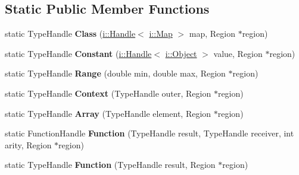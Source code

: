 \subsection*{Static Public Member Functions}
\begin{DoxyCompactItemize}
\item 
\hypertarget{classv8_1_1internal_1_1_type_impl_ab3e641409ec9bed3b628f107d8d888aa}{}static Type\+Handle {\bfseries Class} (\hyperlink{classv8_1_1internal_1_1_handle}{i\+::\+Handle}$<$ \hyperlink{classv8_1_1internal_1_1_map}{i\+::\+Map} $>$ map, Region $\ast$region)\label{classv8_1_1internal_1_1_type_impl_ab3e641409ec9bed3b628f107d8d888aa}

\item 
\hypertarget{classv8_1_1internal_1_1_type_impl_a8a767c3020727c1d503c132b374b3911}{}static Type\+Handle {\bfseries Constant} (\hyperlink{classv8_1_1internal_1_1_handle}{i\+::\+Handle}$<$ \hyperlink{classv8_1_1internal_1_1_object}{i\+::\+Object} $>$ value, Region $\ast$region)\label{classv8_1_1internal_1_1_type_impl_a8a767c3020727c1d503c132b374b3911}

\item 
\hypertarget{classv8_1_1internal_1_1_type_impl_ac423a3cd24ed930b3a1a114ba6c821c4}{}static Type\+Handle {\bfseries Range} (double min, double max, Region $\ast$region)\label{classv8_1_1internal_1_1_type_impl_ac423a3cd24ed930b3a1a114ba6c821c4}

\item 
\hypertarget{classv8_1_1internal_1_1_type_impl_af82147ba750aced8b1127cbb6dc107a6}{}static Type\+Handle {\bfseries Context} (Type\+Handle outer, Region $\ast$region)\label{classv8_1_1internal_1_1_type_impl_af82147ba750aced8b1127cbb6dc107a6}

\item 
\hypertarget{classv8_1_1internal_1_1_type_impl_a7ab83a0482b8d96f8913fb85428894cc}{}static Type\+Handle {\bfseries Array} (Type\+Handle element, Region $\ast$region)\label{classv8_1_1internal_1_1_type_impl_a7ab83a0482b8d96f8913fb85428894cc}

\item 
\hypertarget{classv8_1_1internal_1_1_type_impl_a450d9540cbc9660cf5efde4fff9e59ce}{}static Function\+Handle {\bfseries Function} (Type\+Handle result, Type\+Handle receiver, int arity, Region $\ast$region)\label{classv8_1_1internal_1_1_type_impl_a450d9540cbc9660cf5efde4fff9e59ce}

\item 
\hypertarget{classv8_1_1internal_1_1_type_impl_ac49353b23cf21ba1983bd95d2aeeb9df}{}static Type\+Handle {\bfseries Function} (Type\+Handle result, Region $\ast$region)\label{classv8_1_1internal_1_1_type_impl_ac49353b23cf21ba1983bd95d2aeeb9df}


\end{DoxyCompactItemize}
